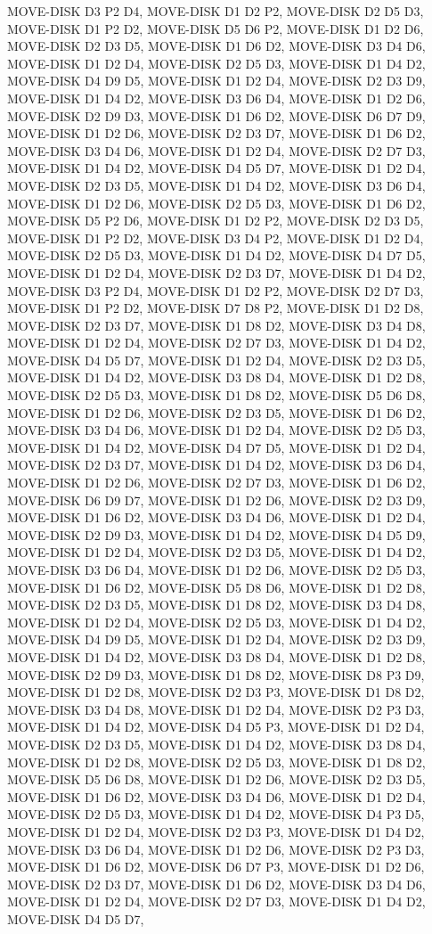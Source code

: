\documentclass[12pt]{article}
\begin{document}
\begin{appendix}
\begin{itemize}
MOVE-DISK D3 P2 D4,  MOVE-DISK D1 D2 P2,  MOVE-DISK D2 D5 D3,  MOVE-DISK D1 P2 D2,  MOVE-DISK D5 D6 P2,  MOVE-DISK D1 D2 D6,  MOVE-DISK D2 D3 D5,  MOVE-DISK D1 D6 D2,  MOVE-DISK D3 D4 D6,  MOVE-DISK D1 D2 D4,  MOVE-DISK D2 D5 D3,  MOVE-DISK D1 D4 D2,  MOVE-DISK D4 D9 D5,  MOVE-DISK D1 D2 D4,  MOVE-DISK D2 D3 D9,  MOVE-DISK D1 D4 D2,  MOVE-DISK D3 D6 D4,  MOVE-DISK D1 D2 D6,  MOVE-DISK D2 D9 D3,  MOVE-DISK D1 D6 D2,  MOVE-DISK D6 D7 D9,  MOVE-DISK D1 D2 D6,  MOVE-DISK D2 D3 D7,  MOVE-DISK D1 D6 D2,  MOVE-DISK D3 D4 D6,  MOVE-DISK D1 D2 D4,  MOVE-DISK D2 D7 D3,  MOVE-DISK D1 D4 D2,  MOVE-DISK D4 D5 D7,  MOVE-DISK D1 D2 D4,  MOVE-DISK D2 D3 D5,  MOVE-DISK D1 D4 D2,  MOVE-DISK D3 D6 D4,  MOVE-DISK D1 D2 D6,  MOVE-DISK D2 D5 D3,  MOVE-DISK D1 D6 D2,  MOVE-DISK D5 P2 D6,  MOVE-DISK D1 D2 P2,  MOVE-DISK D2 D3 D5,  MOVE-DISK D1 P2 D2,  MOVE-DISK D3 D4 P2,  MOVE-DISK D1 D2 D4,  MOVE-DISK D2 D5 D3,  MOVE-DISK D1 D4 D2,  MOVE-DISK D4 D7 D5,  MOVE-DISK D1 D2 D4,  MOVE-DISK D2 D3 D7,  MOVE-DISK D1 D4 D2,  MOVE-DISK D3 P2 D4,  MOVE-DISK D1 D2 P2,  MOVE-DISK D2 D7 D3,  MOVE-DISK D1 P2 D2,  MOVE-DISK D7 D8 P2,  MOVE-DISK D1 D2 D8,  MOVE-DISK D2 D3 D7,  MOVE-DISK D1 D8 D2,  MOVE-DISK D3 D4 D8,  MOVE-DISK D1 D2 D4,  MOVE-DISK D2 D7 D3,  MOVE-DISK D1 D4 D2,  MOVE-DISK D4 D5 D7,  MOVE-DISK D1 D2 D4,  MOVE-DISK D2 D3 D5,  MOVE-DISK D1 D4 D2,  MOVE-DISK D3 D8 D4,  MOVE-DISK D1 D2 D8,  MOVE-DISK D2 D5 D3,  MOVE-DISK D1 D8 D2,  MOVE-DISK D5 D6 D8,  MOVE-DISK D1 D2 D6,  MOVE-DISK D2 D3 D5,  MOVE-DISK D1 D6 D2,  MOVE-DISK D3 D4 D6,  MOVE-DISK D1 D2 D4,  MOVE-DISK D2 D5 D3,  MOVE-DISK D1 D4 D2,  MOVE-DISK D4 D7 D5,  MOVE-DISK D1 D2 D4,  MOVE-DISK D2 D3 D7,  MOVE-DISK D1 D4 D2,  MOVE-DISK D3 D6 D4,  MOVE-DISK D1 D2 D6,  MOVE-DISK D2 D7 D3,  MOVE-DISK D1 D6 D2,  MOVE-DISK D6 D9 D7,  MOVE-DISK D1 D2 D6,  MOVE-DISK D2 D3 D9,  MOVE-DISK D1 D6 D2,  MOVE-DISK D3 D4 D6,  MOVE-DISK D1 D2 D4,  MOVE-DISK D2 D9 D3,  MOVE-DISK D1 D4 D2,  MOVE-DISK D4 D5 D9,  MOVE-DISK D1 D2 D4,  MOVE-DISK D2 D3 D5,  MOVE-DISK D1 D4 D2,  MOVE-DISK D3 D6 D4,  MOVE-DISK D1 D2 D6,  MOVE-DISK D2 D5 D3,  MOVE-DISK D1 D6 D2,  MOVE-DISK D5 D8 D6,  MOVE-DISK D1 D2 D8,  MOVE-DISK D2 D3 D5,  MOVE-DISK D1 D8 D2,  MOVE-DISK D3 D4 D8,  MOVE-DISK D1 D2 D4,  MOVE-DISK D2 D5 D3,  MOVE-DISK D1 D4 D2,  MOVE-DISK D4 D9 D5,  MOVE-DISK D1 D2 D4,  MOVE-DISK D2 D3 D9,  MOVE-DISK D1 D4 D2,  MOVE-DISK D3 D8 D4,  MOVE-DISK D1 D2 D8,  MOVE-DISK D2 D9 D3,  MOVE-DISK D1 D8 D2,  MOVE-DISK D8 P3 D9,  MOVE-DISK D1 D2 D8,  MOVE-DISK D2 D3 P3,  MOVE-DISK D1 D8 D2,  MOVE-DISK D3 D4 D8,  MOVE-DISK D1 D2 D4,  MOVE-DISK D2 P3 D3,  MOVE-DISK D1 D4 D2,  MOVE-DISK D4 D5 P3,  MOVE-DISK D1 D2 D4,  MOVE-DISK D2 D3 D5,  MOVE-DISK D1 D4 D2,  MOVE-DISK D3 D8 D4,  MOVE-DISK D1 D2 D8,  MOVE-DISK D2 D5 D3,  MOVE-DISK D1 D8 D2,  MOVE-DISK D5 D6 D8,  MOVE-DISK D1 D2 D6,  MOVE-DISK D2 D3 D5,  MOVE-DISK D1 D6 D2,  MOVE-DISK D3 D4 D6,  MOVE-DISK D1 D2 D4,  MOVE-DISK D2 D5 D3,  MOVE-DISK D1 D4 D2,  MOVE-DISK D4 P3 D5,  MOVE-DISK D1 D2 D4,  MOVE-DISK D2 D3 P3,  MOVE-DISK D1 D4 D2,  MOVE-DISK D3 D6 D4,  MOVE-DISK D1 D2 D6,  MOVE-DISK D2 P3 D3,  MOVE-DISK D1 D6 D2,  MOVE-DISK D6 D7 P3,  MOVE-DISK D1 D2 D6,  MOVE-DISK D2 D3 D7,  MOVE-DISK D1 D6 D2,  MOVE-DISK D3 D4 D6,  MOVE-DISK D1 D2 D4,  MOVE-DISK D2 D7 D3,  MOVE-DISK D1 D4 D2,  MOVE-DISK D4 D5 D7,  
\end{itemize}
\end{appendix}
\end{document}
